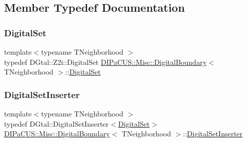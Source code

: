 \subsection{Member Typedef Documentation}
\mbox{\label{structDIPaCUS_1_1Misc_1_1DigitalBoundary_aedd7527b8021fdf88fcb01474bd77027}} 
\subsubsection{\texorpdfstring{Digital\+Set}{DigitalSet}}
{\footnotesize\ttfamily template$<$typename T\+Neighborhood $>$ \\
typedef D\+Gtal\+::\+Z2i\+::\+Digital\+Set \mbox{\hyperlink{structDIPaCUS_1_1Misc_1_1DigitalBoundary}{D\+I\+Pa\+C\+U\+S\+::\+Misc\+::\+Digital\+Boundary}}$<$ T\+Neighborhood $>$\+::\mbox{\hyperlink{structDIPaCUS_1_1Misc_1_1DigitalBoundary_aedd7527b8021fdf88fcb01474bd77027}{Digital\+Set}}}

\mbox{\label{structDIPaCUS_1_1Misc_1_1DigitalBoundary_ac32cd8263d5d22cb0f62c407c00113db}} 
\subsubsection{\texorpdfstring{Digital\+Set\+Inserter}{DigitalSetInserter}}
{\footnotesize\ttfamily template$<$typename T\+Neighborhood $>$ \\
typedef D\+Gtal\+::\+Digital\+Set\+Inserter$<$\mbox{\hyperlink{structDIPaCUS_1_1Misc_1_1DigitalBoundary_aedd7527b8021fdf88fcb01474bd77027}{Digital\+Set}}$>$ \mbox{\hyperlink{structDIPaCUS_1_1Misc_1_1DigitalBoundary}{D\+I\+Pa\+C\+U\+S\+::\+Misc\+::\+Digital\+Boundary}}$<$ T\+Neighborhood $>$\+::\mbox{\hyperlink{structDIPaCUS_1_1Misc_1_1DigitalBoundary_ac32cd8263d5d22cb0f62c407c00113db}{Digital\+Set\+Inserter}}}

